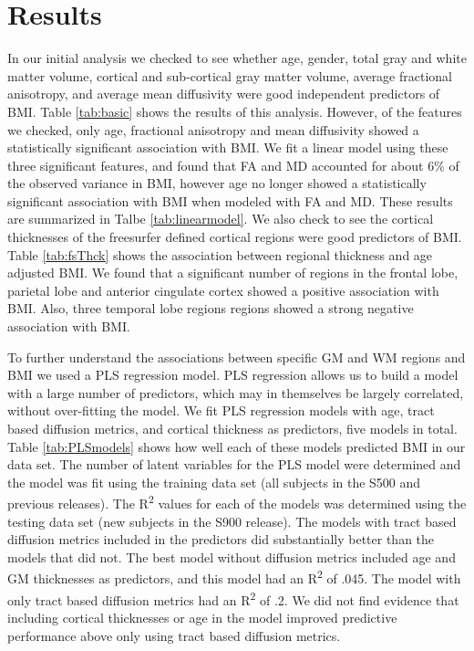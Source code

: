 \section{Results}
    In our initial analysis we checked to see whether age, gender, total gray and white matter volume, cortical and sub-cortical gray matter volume, average fractional anisotropy, and average mean diffusivity were good independent predictors of BMI. Table \ref{tab:basic} shows the results of this analysis. However, of the features we checked, only age, fractional anisotropy and mean diffusivity showed a statistically significant association with BMI. We fit a linear model using these three significant features, and found that FA and MD accounted for about 6\% of the observed variance in BMI, however age no longer showed a statistically significant association with BMI when modeled with FA and MD. These results are summarized in Talbe \ref{tab:linearmodel}. We also check to see the cortical thicknesses of the freesurfer defined cortical regions were good predictors of BMI. Table \ref{tab:fsThck} shows the association between regional thickness and age adjusted BMI. We found that a significant number of regions in the frontal lobe, parietal lobe and anterior cingulate cortex showed a positive association with BMI. Also, three temporal lobe regions regions showed a strong negative association with BMI.
    
    To further understand the associations between specific GM and WM regions and BMI we used a PLS regression model. PLS regression allows us to build a model with a large number of predictors, which may in themselves be largely correlated, without over-fitting the model. We fit PLS regression models with age, tract based diffusion metrics, and cortical thickness as predictors, five models in total. Table \ref{tab:PLSmodels} shows how well each of these models predicted BMI in our data set. The number of latent variables for the PLS model were determined and the model was fit using the training data set (all subjects in the S500 and previous releases). The R\textsuperscript{2} values for each of the models was determined using the testing data set (new subjects in the S900 release). The models with tract based diffusion metrics included in the predictors did substantially better than the models that did not. The best model without diffusion metrics included age and GM thicknesses as predictors, and this model had an R\textsuperscript{2} of .045. The model with only tract based diffusion metrics had an R\textsuperscript{2} of .2. We did not find evidence that including cortical thicknesses or age in the model improved predictive performance above only using tract based diffusion metrics.
    
